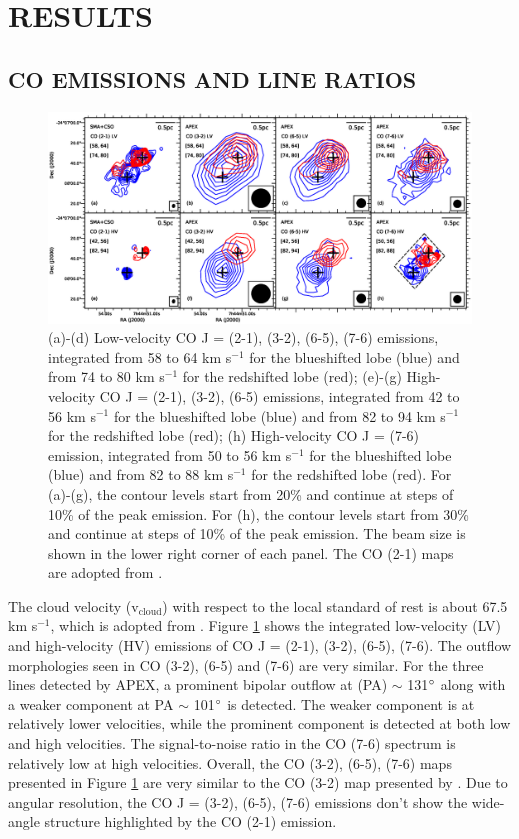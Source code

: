 \section{RESULTS}
\subsection{CO EMISSIONS AND LINE RATIOS}

\begin{figure}[htbp]
\includegraphics[scale=.60]{./fig/ori_contourall.eps}
\caption{(a)-(d) Low-velocity CO J = (2-1), (3-2), (6-5), (7-6) emissions, integrated from 58 to 64 km s$^{-1} $ for the blueshifted lobe (blue) and from 74 to 80 km s$^{-1}$ for the redshifted lobe (red); (e)-(g) High-velocity CO J = (2-1), (3-2), (6-5) emissions,  integrated from 42 to 56 km s$^{-1} $ for the blueshifted lobe (blue) and from 82 to 94 km s$^{-1}$ for the redshifted lobe (red); (h) High-velocity CO J = (7-6) emission, integrated from 50 to 56 km s$^{-1} $ for the blueshifted lobe (blue) and from 82 to 88 km s$^{-1}$ for the redshifted lobe (red). For (a)-(g), the contour levels start from 20\% and continue at steps of 10\% of the peak emission. For (h), the contour levels start from 30\% and continue at steps of 10\% of the peak emission. The beam size is shown in the lower right corner of each panel. The CO (2-1) maps are adopted from \citet{2009ApJ...696...66Q}. \label{fig1}}
\end{figure}

The cloud velocity (v$_{\mathrm{cloud}}$) with respect to the local standard of rest is about 67.5 km s$^{-1}$, which is adopted from \citet{2003A&A...412..175K}. Figure \ref{fig1} shows the integrated low-velocity (LV) and high-velocity (HV) emissions of CO J = (2-1), (3-2), (6-5), (7-6). The outflow morphologies seen in CO (3-2), (6-5) and (7-6) are very similar. For the three lines detected by APEX, a prominent bipolar outflow at (PA) $\sim$ 131${\mbox{$^\circ$}}$ along with a weaker component at PA $\sim$ 101${\mbox{$^\circ$}}$ is detected. The weaker component is at relatively lower velocities, while the prominent component is detected at both low and high velocities. The signal-to-noise ratio in the CO (7-6) spectrum is relatively low at high velocities. Overall, the CO (3-2), (6-5), (7-6) maps presented in Figure \ref{fig1} are very similar to the CO (3-2) map presented by \citet{2003A&A...412..175K}. Due to angular resolution, the CO J = (3-2), (6-5), (7-6) emissions don't show the wide-angle structure highlighted by the CO (2-1) emission.

